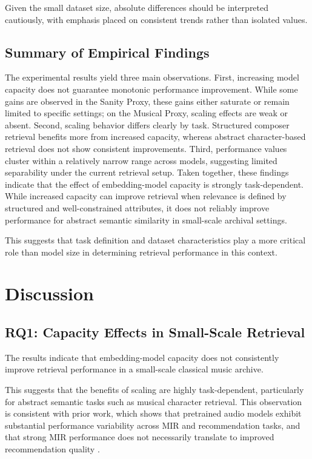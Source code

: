 \documentclass{article}
\begin{document}
Given the small dataset size, absolute differences should be interpreted cautiously, 
with emphasis placed on consistent trends rather than isolated values.

\subsection{Summary of Empirical Findings}
The experimental results yield three main observations.
First, increasing model capacity does not guarantee monotonic performance improvement. 
While some gains are observed in the Sanity Proxy, these gains either saturate or remain limited to specific settings; 
on the Musical Proxy, scaling effects are weak or absent.
Second, scaling behavior differs clearly by task. Structured composer retrieval benefits more from increased capacity, 
whereas abstract character-based retrieval does not show consistent improvements.
Third, performance values cluster within a relatively narrow range across models, 
suggesting limited separability under the current retrieval setup.
Taken together, these findings indicate that the effect of embedding-model capacity is strongly task-dependent.
While increased capacity can improve retrieval when relevance is defined by structured and well-constrained attributes, 
it does not reliably improve performance for abstract semantic similarity in small-scale archival settings.

This suggests that task definition and dataset characteristics play a more critical role than model size in determining retrieval performance in this context.


\section{Discussion}

\subsection{RQ1: Capacity Effects in Small-Scale Retrieval}
The results indicate that embedding-model capacity does not consistently improve retrieval performance in a small-scale classical music archive. 

This suggests that the benefits of scaling are highly task-dependent, particularly for abstract semantic tasks such as musical character retrieval. 
This observation is consistent with prior work, which shows that pretrained audio models exhibit substantial performance variability across MIR and recommendation tasks, and that strong MIR performance does not necessarily translate to improved recommendation quality \cite{tamm2024}.
\end{document}
